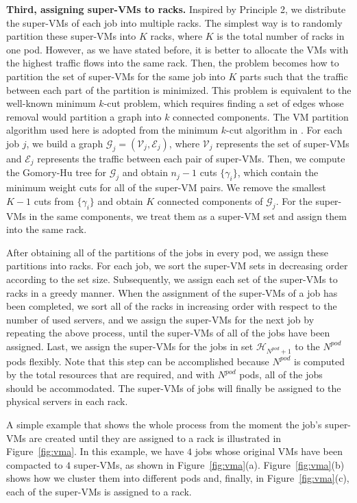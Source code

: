 \documentclass[journal,single-space,two column,twoside,10pt]{IEEEtran}
\begin{document}
\textbf{Third, assigning super-VMs to racks.} Inspired by Principle 2, we distribute the super-VMs of each job into multiple racks. The simplest way is to randomly partition these super-VMs into $K$ racks, where $K$ is the total number of racks in one pod. However, as we have stated before, it is better to allocate the VMs with the highest traffic flows into the same rack. Then, the problem becomes how to partition the set of super-VMs for the same job into $K$ parts such that the traffic between each part of the partition is minimized. This problem is equivalent to the well-known minimum $k$-cut problem, which requires finding a set of edges whose removal would partition a graph into $k$ connected components. The VM partition algorithm used here is adopted from the minimum $k$-cut algorithm in \cite{Saran_Vazirani-1995}. For each job $j$, we build a graph $\mathcal{G}_j = (\mathcal{V}_j, \mathcal{E}_j)$, where $\mathcal{V}_j$ represents the set of super-VMs and $\mathcal{E}_j$ represents the traffic between each pair of super-VMs. Then, we compute the Gomory-Hu tree for $\mathcal{G}_j$ and obtain $n_j - 1$ cuts $\{\gamma_i\}$, which contain the minimum weight cuts for all of the super-VM pairs. We remove the smallest $K-1$ cuts from $\{\gamma_i\}$ and obtain $K$ connected components of $\mathcal{G}_j$. For the super-VMs in the same components, we treat them as a super-VM set and assign them into the same rack.

After obtaining all of the partitions of the jobs in every pod, we assign these partitions into racks. For each job, we sort the super-VM sets in decreasing order according to the set size. Subsequently, we assign each set of the super-VMs to racks in a greedy manner. When the assignment of the super-VMs of a job has been completed, we sort all of the racks in increasing order with respect to the number of used servers, and we assign the super-VMs for the next job by repeating the above process, until the super-VMs of all of the jobs have been assigned. Last, we assign the super-VMs for the jobs in set $\mathcal{H}_{N^{pod} + 1}$ to the $N^{pod}$ pods flexibly. Note that this step can be accomplished because $N^{pod}$ is computed by the total resources that are required, and with $N^{pod}$ pods, all of the jobs should be accommodated. The super-VMs of jobs will finally be assigned to the physical servers in each rack.

A simple example that shows the whole process from the moment the job's super-VMs are created until they are assigned to a rack is illustrated in Figure~\ref{fig:vma}. In this example, we have $4$ jobs whose original VMs have been compacted to $4$ super-VMs, as shown in Figure~\ref{fig:vma}(a). Figure~\ref{fig:vma}(b) shows how we cluster them into different pods and, finally, in Figure~\ref{fig:vma}(c), each of the super-VMs is assigned to a rack.
\end{document}
